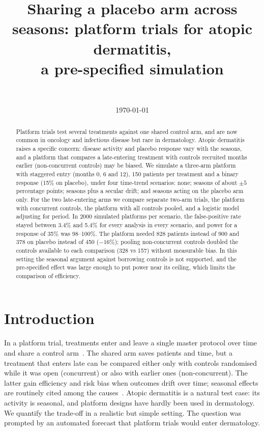 \documentclass[11pt]{article}
\title{Sharing a placebo arm across seasons: platform trials for atopic dermatitis,\\ a pre-specified simulation}
\author{\authorname\\ \small \affiliation}
\date{\today}
\begin{document}
\maketitle

\begin{abstract}
Platform trials test several treatments against one shared control arm, and are now common in oncology and
infectious disease but rare in dermatology. Atopic dermatitis raises a specific concern: disease activity and placebo
response vary with the seasons, and a platform that compares a late-entering treatment with controls recruited months
earlier (non-concurrent controls) may be biased. We simulate a three-arm platform with staggered entry (months 0, 6
and 12), 150 patients per treatment and a binary response (15\% on placebo), under four time-trend scenarios: none;
seasons of about $\pm5$ percentage points; seasons plus a secular drift; and seasons acting on the placebo arm only.
For the two late-entering arms we compare separate two-arm trials, the platform with concurrent controls, the
platform with all controls pooled, and a logistic model adjusting for period. In 2000 simulated platforms per scenario,
the false-positive rate stayed between 3.4\% and 5.4\% for every analysis in every scenario, and power for a response
of 35\% was 98--100\%. The platform needed 828 patients instead of 900 and 378 on placebo instead of 450
($-16\%$); pooling non-concurrent controls doubled the controls available to each comparison (328 vs 157) without
measurable bias. In this setting the seasonal argument against borrowing controls is not supported, and the
pre-specified effect was large enough to put power near its ceiling, which limits the comparison of efficiency.
\end{abstract}

\section{Introduction}
In a platform trial, treatments enter and leave a single master protocol over time and share a control
arm~\cite{Woodcock}. The shared arm saves patients and time, but a treatment that enters late can be compared either
only with controls randomised while it was open (concurrent) or also with earlier ones (non-concurrent). The latter
gain efficiency and risk bias when outcomes drift over time; seasonal effects are routinely cited among the
causes~\cite{BofillRoig2022,Krotka}. Atopic dermatitis is a natural test case: its activity is seasonal, and
platform designs have hardly been used in dermatology. We quantify the trade-off in a realistic but simple setting.
The question was prompted by an automated forecast that platform trials would enter dermatology.
\end{document}
